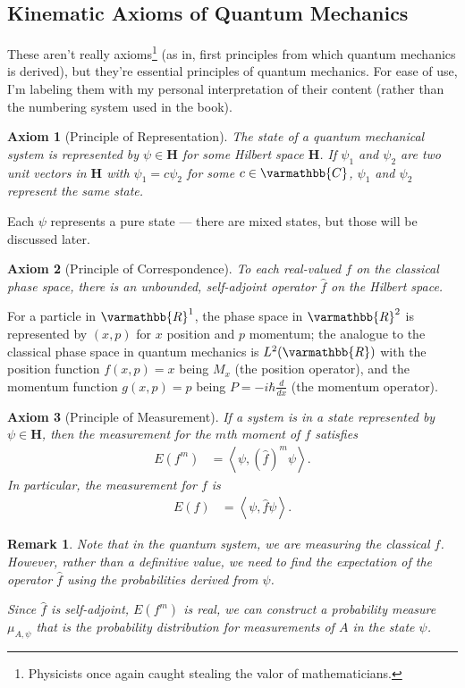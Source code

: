 \documentclass[12pt]{extarticle}
\newtheorem*{remark}{Remark}
\newcommand{\R}{\varmathbb{R}}
\newcommand{\C}{\varmathbb{C}}
\newcommand{\iprod}[2]{\left\langle #1,#2\right\rangle}
\theoremstyle{plain}
\newtheorem*{axiom}{Axiom}%
\theoremstyle{definition}
\theoremstyle{remark}
\renewcommand{\newline}{\hfill\break}
\begin{document}
  \subsection{Kinematic Axioms of Quantum Mechanics}%
  These aren't really axioms\footnote{Physicists once again caught stealing the valor of mathematicians.} (as in, first principles from which quantum mechanics is derived), but they're essential principles of quantum mechanics. For ease of use, I'm labeling them with my personal interpretation of their content (rather than the numbering system used in the book).
  \begin{axiom}[Principle of Representation]
    The state of a quantum mechanical system is represented by $\psi \in \mathbf{H}$ for some Hilbert space $\mathbf{H}$. If $\psi_1$ and $\psi_2$ are two unit vectors in $\mathbf{H}$ with $\psi_1 = c\psi_2$ for some $c\in \C$, $\psi_1$ and $\psi_2$ represent the same state.
  \end{axiom}
  Each $\psi$ represents a pure state --- there are mixed states, but those will be discussed later.
  \begin{axiom}[Principle of Correspondence]
    To each real-valued $f$ on the classical phase space, there is an unbounded, self-adjoint operator $\hat{f}$ on the Hilbert space.
  \end{axiom}
  For a particle in $\R^{1}$, the phase space in $\R^{2}$ is represented by $(x,p)$ for $x$ position and $p$ momentum; the analogue to the classical phase space in quantum mechanics is $L^{2}(\R)$ with the position function $f(x,p) = x$ being $M_x$ (the position operator), and the momentum function $g(x,p) = p$ being $P = -i\hbar\frac{d}{dx}$ (the momentum operator).
  \begin{axiom}[Principle of Measurement]
    If a system is in a state represented by $\psi \in \mathbf{H}$, then the measurement for the $m$th moment of $f$ satisfies
    \begin{align*}
      E(f^{m}) &= \iprod{\psi}{\left(\hat{f}\right)^m\psi}.
    \end{align*}
    In particular, the measurement for $f$ is
    \begin{align*}
      E(f) &= \iprod{\psi}{\hat{f}\psi}.
    \end{align*}
  \end{axiom}
  \begin{remark}
    Note that in the quantum system, we are measuring the \textit{classical} $f$. However, rather than a definitive value, we need to find the expectation of the operator $\hat{f}$ using the probabilities derived from $\psi$.\newline

    Since $\hat{f}$ is self-adjoint, $E(f^{m})$ is real, we can construct a probability measure $\mu_{A,\psi}$ that is the probability distribution for measurements of $A$ in the state $\psi$.
  \end{remark}
\end{document}
